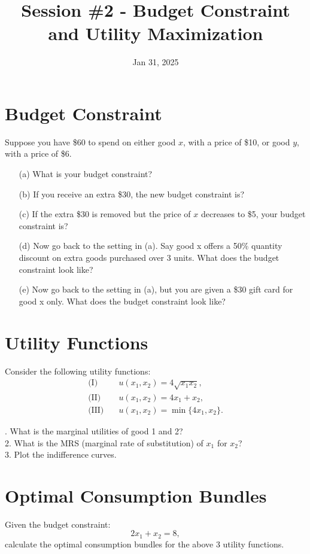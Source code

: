 \documentclass[a4paper,12pt]{article}
\begin{document}
\title{Session \#2 - Budget Constraint and Utility Maximization}
\author{Jan 31, 2025}
\date{}
\maketitle

\section*{Budget Constraint}

Suppose you have \$60 to spend on either good $x$, with a price of \$10, or good $y$, with a price of \$6.

\begin{enumerate}
    \item[(a)] What is your budget constraint?

    \item[(b)] If you receive an extra \$30, the new budget constraint is?

    \item[(c)] If the extra \$30 is removed but the price of $x$ decreases to \$5, your budget constraint is?
    \item[(d)] Now go back to the setting in (a). Say good x offers a 50\% quantity discount on
extra goods purchased over 3 units. What does the budget constraint look like?
\item[(e)] Now go back to the setting in (a), but you are given a \$30 gift card for good x only.
What does the budget constraint look like?
\end{enumerate}

\section*{Utility Functions}

Consider the following utility functions:
\begin{align*}
    \text{(I)} & \quad u(x_1, x_2) = 4\sqrt{x_1 x_2}, \\
    \text{(II)} & \quad u(x_1, x_2) = 4x_1 + x_2, \\
    \text{(III)} & \quad u(x_1, x_2) = \min\{4x_1, x_2\}.
\end{align*}

. What is the marginal utilities of good 1 and 2?\\
2. What is the MRS (marginal rate of substitution) of $x_{1}$ for $x_{2}$?\\
3. Plot the indifference curves. 

\section*{Optimal Consumption Bundles}

Given the budget constraint:
\[
2x_1 + x_2 = 8,
\]
\noindent calculate the optimal consumption bundles for the above 3 utility functions.
\end{document}
